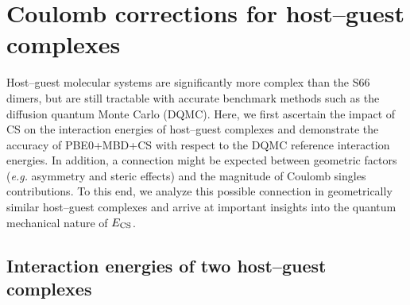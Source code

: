\documentclass[aps,prl,groupaddress, twocolumn]{revtex4-1}  %
\begin{document}

\section*{Coulomb corrections for host--guest complexes}

Host--guest molecular systems are significantly more complex than the S66 dimers, but are still tractable with accurate benchmark methods such as the diffusion quantum Monte Carlo (DQMC). Here, we first ascertain the impact of CS on the interaction energies of host--guest complexes and demonstrate the accuracy of PBE0+MBD+CS with respect to the DQMC reference interaction energies. In addition, a connection might be expected between geometric factors (\textit{e.g.} asymmetry and steric effects) and the magnitude of Coulomb singles contributions. To this end, we analyze this possible connection in geometrically similar host--guest complexes and arrive at important insights into the quantum mechanical nature of $E_{\rm CS}$.

\subsection*{Interaction energies of two host--guest complexes}
\end{document}
